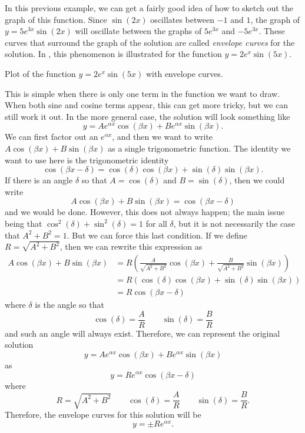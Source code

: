 In this previous example, we can get a fairly good idea of how to sketch out the graph of this function. Since $\sin(2x)$ oscillates between $-1$ and $1$, the graph of $y = 5e^{3x}\sin(2x)$ will oscillate between the graphs of $5e^{3x}$ and $-5e^{3x}$. These curves that surround the graph of the solution are called \emph{envelope curves} for the solution. In , this phenomenon is illustrated for the function $y = 2e^x\sin(5x)$.

\begin{myfig}
\capstart
{}
\caption{Plot of the function $y=2e^x \sin(5x)$ with envelope curves. \label{envelope:fig}}
\end{myfig}

This is simple when there is only one term in the function we want to draw. When both sine and cosine terms appear, this can get more tricky, but we can still work it out. In the more general case, the solution will look something like
\[ y = Ae^{\alpha x}\cos(\beta x) + B e^{\alpha x} \sin(\beta x). \] We can first factor out an $e^{\alpha x}$, and then we want to write $A \cos(\beta x) + B \sin(\beta x)$ as a single trigonometric function.  The identity we want to use here is the trigonometric identity
\[ \cos(\beta x - \delta) = \cos(\delta) \cos(\beta x) + \sin(\delta) \sin(\beta x). \] If there is an angle $\delta$ so that $A = \cos(\delta)$ and $B = \sin(\delta)$, then we could write
\[  A \cos(\beta x) + B \sin(\beta x) = \cos(\beta x - \delta) \] and we would be done. However, this does not always happen; the main issue being that $\cos^2(\delta) + \sin^2(\delta) = 1$ for all $\delta$, but it is not necessarily the case that $A^2 + B^2 = 1$. But we can force this last condition. If we define $R = \sqrt{A^2 + B^2}$, then we can rewrite this expression as
\[
\begin{split}
A \cos(\beta x) + B \sin(\beta x) &= R \left( \frac{A}{\sqrt{A^2 + B^2}} \cos(\beta x) + \frac{B}{\sqrt{A^2 + B^2}}\sin(\beta x)\right) \\
&= R \left( \cos(\delta) \cos(\beta x) + \sin(\delta) \sin(\beta x) \right) \\
&= R \cos(\beta x - \delta)
\end{split}
\]
where $\delta$ is the angle so that
\[ \cos(\delta) = \frac{A}{R} \qquad \sin(\delta) = \frac{B}{R} \] and such an angle will always exist. Therefore, we can represent the original solution 
\[ y = Ae^{\alpha x}\cos(\beta x) + B e^{\alpha x} \sin(\beta x) \] as 
\[ y = Re^{\alpha x}\cos(\beta x - \delta) \] where
\[ R = \sqrt{A^2 + B^2} \qquad \cos(\delta) = \frac{A}{R} \qquad \sin(\delta) = \frac{B}{R}. \] Therefore, the envelope curves for this solution will be 
\[ y = \pm Re^{\alpha x}. \]


